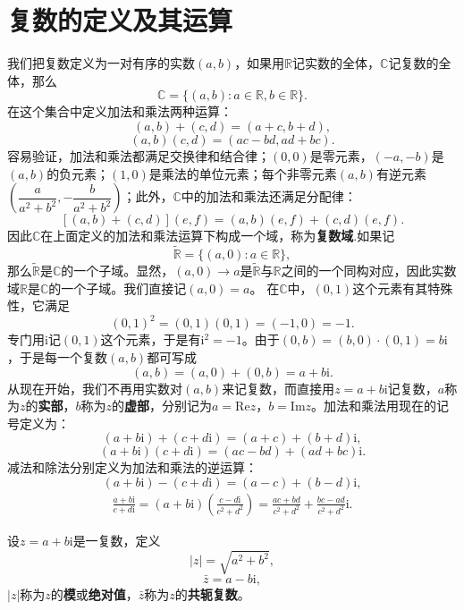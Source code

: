 \documentclass[../../main.tex]{subfiles}%
\begin{document}
\section{复数的定义及其运算}

\begin{definition}[复数域]
我们把复数定义为一对有序的实数\((a,b)\)，如果用\(\mathbb{R}\)记实数的全体，\(\mathbb{C}\)记复数的全体，那么
\[
\mathbb{C} = \{ (a,b) : a \in \mathbb{R}, b \in \mathbb{R} \}.
\]
在这个集合中定义加法和乘法两种运算：
\[
(a,b) + (c,d) = (a + c, b + d),
\]
\[
(a,b)(c,d) = (ac - bd, ad + bc).
\]
容易验证，加法和乘法都满足交换律和结合律；\((0,0)\)是零元素，\((-a,-b)\)是\((a,b)\)的负元素；\((1,0)\)是乘法的单位元素；每个非零元素\((a,b)\)有逆元素\(\left( \dfrac{a}{a^2 + b^2}, -\dfrac{b}{a^2 + b^2} \right)\)；此外，\(\mathbb{C}\)中的加法和乘法还满足分配律：
\[
[(a,b) + (c,d)](e,f) = (a,b)(e,f) + (c,d)(e,f).
\]
因此\(\mathbb{C}\)在上面定义的加法和乘法运算下构成一个域，称为\textbf{复数域}.如果记
\[
\tilde{\mathbb{R}} = \{ (a,0) : a \in \mathbb{R} \},
\]
那么\(\tilde{\mathbb{R}}\)是\(\mathbb{C}\)的一个子域。显然，\((a,0) \to a\)是\(\tilde{\mathbb{R}}\)与\(\mathbb{R}\)之间的一个同构对应，因此实数域\(\mathbb{R}\)是\(\mathbb{C}\)的一个子域。我们直接记\((a,0) = a\)。
在\(\mathbb{C}\)中，\((0,1)\)这个元素有其特殊性，它满足
\[
(0,1)^2 = (0,1)(0,1) = (-1,0) = -1.
\]
专门用\(\mathrm{i}\)记\((0,1)\)这个元素，于是有\(\mathrm{i}^2 = -1\)。由于\((0,b) = (b,0) \cdot (0,1) = b\mathrm{i}\)，于是每一个复数\((a,b)\)都可写成
\[
(a,b) = (a,0) + (0,b) = a + b\mathrm{i}.
\]
从现在开始，我们不再用实数对\((a,b)\)来记复数，而直接用\(z = a + b\mathrm{i}\)记复数，\(a\)称为\(z\)的\textbf{实部}，\(b\)称为\(z\)的\textbf{虚部}，分别记为\(a = \mathrm{Re}z\)，\(b = \mathrm{Im}z\)。加法和乘法用现在的记号定义为：
\[
(a + b\mathrm{i}) + (c + d\mathrm{i}) = (a + c) + (b + d)\mathrm{i},
\]
\[
(a + b\mathrm{i})(c + d\mathrm{i}) = (ac - bd) + (ad + bc)\mathrm{i}.
\]
减法和除法分别定义为加法和乘法的逆运算：
\[
(a + b\mathrm{i}) - (c + d\mathrm{i}) = (a - c) + (b - d)\mathrm{i},
\]
\[
\begin{split}
\frac{a + b\mathrm{i}}{c + d\mathrm{i}} = (a + b\mathrm{i})\left( \frac{c - d\mathrm{i}}{c^2 + d^2} \right)= \frac{ac + bd}{c^2 + d^2} + \frac{bc - ad}{c^2 + d^2}\mathrm{i}.
\end{split}
\]

设\(z = a + b\mathrm{i}\)是一复数，定义
\[
|z| = \sqrt{a^2 + b^2},
\]
\[
\bar{z} = a - b\mathrm{i},
\]
\(|z|\)称为\(z\)的\textbf{模}或\textbf{绝对值}，\(\bar{z}\)称为\(z\)的\textbf{共轭复数}。
\end{definition}
\end{document}

